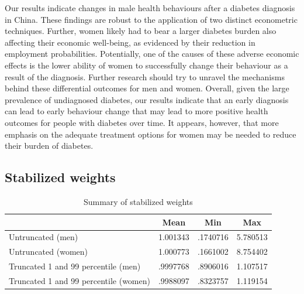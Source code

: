 Our results indicate changes in male health behaviours after a diabetes diagnosis in China. These findings are robust to the application of two distinct econometric techniques. Further, women likely had to bear a larger diabetes burden also affecting their economic well-being, as evidenced by their reduction in employment probabilities. Potentially, one of the causes of these adverse economic effects is the lower ability of women to successfully change their behaviour as a result of the diagnosis. Further research should try to unravel the mechanisms behind these differential outcomes for men and women. Overall, given the large prevalence of undiagnosed diabetes, our results indicate that an early diagnosis can lead to early behaviour change that may lead to more positive health outcomes for people with diabetes over time. It appears, however, that more emphasis on the adequate treatment options for women may be needed to reduce their burden of diabetes. 

\clearpage

\subsection*{Stabilized weights}

\begin{table}[h]
\caption{\label{tab:stabweights}Summary of stabilized weights}
\begin{adjustbox}{max width=\linewidth}  
{
\def\sym#1{\ifmmode^{#1}\else\(^{#1}\)\fi}
\begin{tabular}{l*{1}{ccc}}
\toprule
                    &        Mean&         Min&         Max\\
\midrule
Untruncated (men)   &    1.001343&    .1740716&   5.780513\\
Untruncated (women) &    1.000773&   .1661002&  8.754402\\
Truncated 1 and 99 percentile (men)&    .9997768&    .8906016&    1.107517\\
Truncated 1 and 99 percentile (women)&    .9988097&    .8323757&    1.119154\\
\end{tabular}
}
\end{adjustbox}
\end{table}

\FloatBarrier


